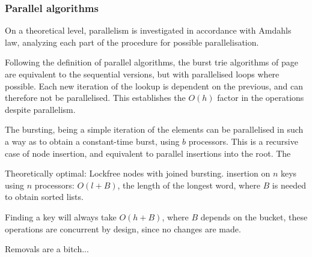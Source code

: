
\subsubsection{Parallel algorithms}
On a theoretical level, parallelism is investigated in accordance with Amdahls
law, analyzing each part of the procedure for possible parallelisation.

Following the definition of parallel algorithms, the burst trie algorithms of
page \pageref{alg:bt_insert} are equivalent to the sequential versions, but
with parallelised loops where possible. Each new iteration of the lookup
is dependent on the previous, and can therefore not be parallelised. This
establishes the $O(h)$ factor in the operations despite parallelism.

The bursting, being a simple iteration of the elements can be parallelised
in such a way as to obtain a constant-time burst, using $b$ processors.
This is a recursive case of node insertion, and equivalent to parallel
insertions into the root. The 

Theoretically optimal: Lockfree nodes with joined bursting.
insertion on $n$ keys using $n$ processors: $O(l+B)$, the length of the longest word, where $B$ is
needed to obtain sorted lists.

Finding a key will always take $O(h+B)$, where $B$ depends on the bucket, these operations
are concurrent by design, since no changes are made.

Removals are a bitch...
